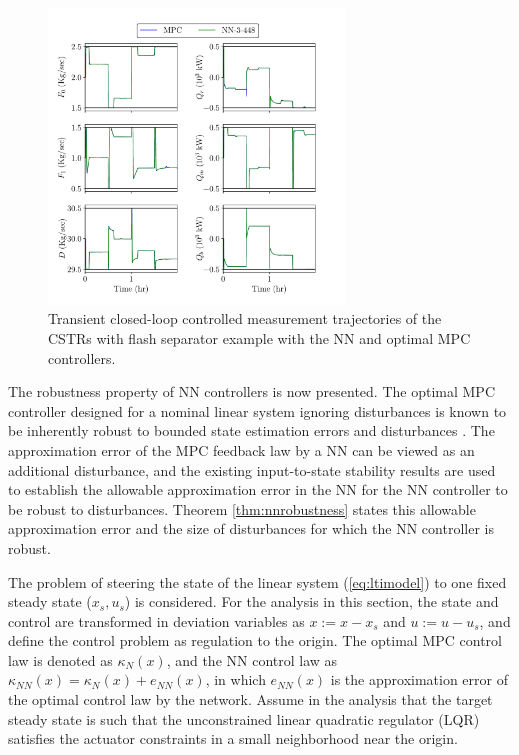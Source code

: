 \documentclass[preprint,5p, twocolumn, authoryear]{elsarticle}
\begin{document}
\begin{figure}[!h]
    \centering
	\includegraphics[page=2, width=0.7\textwidth,
		height=0.5\textheight]{cstrs_comparision_plots.pdf} \caption{Transient
		closed-loop controlled measurement trajectories of the CSTRs with flash
		separator example with the NN and optimal MPC controllers.}
		\label{fig:cl_cstrs_outputs}
\end{figure}

The robustness property of NN controllers is now presented. The optimal MPC
controller designed for a nominal linear system ignoring disturbances is known
to be inherently robust to bounded state estimation errors and disturbances
\citep*{heath:wills:2005, pannocchia:rawlings:wright:2011}. The approximation
error of the MPC feedback law by a NN can be viewed as an additional
disturbance, and the existing input-to-state stability results
\citep*{sontag:wang:1995} are used to establish the allowable approximation
error in the NN for the NN controller to be robust to disturbances. Theorem
\ref{thm:nnrobustness} states this allowable approximation error and the size of
disturbances for which the NN controller is robust.

The problem of steering the state of the linear system (\ref{eq:ltimodel}) to
one fixed steady state ($x_s, u_s$) is considered. For the analysis in this
section, the state and control are transformed in deviation variables as $x := x
- x_s$ and $u := u -u_s$, and define the control problem as regulation to the
origin. The optimal MPC control law is denoted as $\kappa_N(x)$, and the NN
control law as $\kappa_{NN}(x) = \kappa_N(x) + e_{NN}(x)$, in which $e_{NN}(x)$
is the approximation error of the optimal control law by the network. Assume in
the analysis that the target steady state is such that the unconstrained linear
quadratic regulator (LQR) satisfies the actuator constraints in a small
neighborhood near the origin. 
\end{document}
